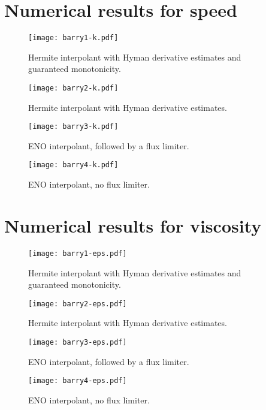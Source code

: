 \documentclass{article}
\begin{document}
%

\section{Numerical results for speed}


\begin{figure}[htbp]
\centering
  \texttt{[image: barry1-k.pdf]}
  \caption{Hermite interpolant with Hyman derivative estimates and guaranteed
    monotonicity.
  \label{fig:barry1-k}}
\end{figure}
\begin{figure}[htbp]
\centering
  \texttt{[image: barry2-k.pdf]}
  \caption{Hermite interpolant with Hyman derivative estimates.
  \label{fig:barry2-k}}
\end{figure}
\begin{figure}[htbp]
\centering
  \texttt{[image: barry3-k.pdf]}
  \caption{ENO interpolant, followed by a flux limiter.
  \label{fig:barry3-k}}
\end{figure}
\begin{figure}[htbp]
\centering
  \texttt{[image: barry4-k.pdf]}
  \caption{ENO interpolant, no flux limiter.
  \label{fig:barry4-k}}
\end{figure}

\clearpage
\section{Numerical results for viscosity}

\begin{figure}[htbp]
\centering
  \texttt{[image: barry1-eps.pdf]}
  \caption{Hermite interpolant with Hyman derivative estimates and guaranteed
    monotonicity.
  \label{fig:barry1-eps}}
\end{figure}
\begin{figure}[htbp]
\centering
  \texttt{[image: barry2-eps.pdf]}
  \caption{Hermite interpolant with Hyman derivative estimates.
  \label{fig:barry2-eps}}
\end{figure}
\begin{figure}[htbp]
\centering
  \texttt{[image: barry3-eps.pdf]}
  \caption{ENO interpolant, followed by a flux limiter.
  \label{fig:barry3-eps}}
\end{figure}
\begin{figure}[htbp]
\centering
  \texttt{[image: barry4-eps.pdf]}
  \caption{ENO interpolant, no flux limiter.
  \label{fig:barry4-eps}}
\end{figure}
\end{document}
